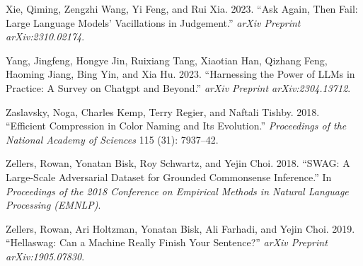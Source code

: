 \documentclass[
]{article}
\newlength{\cslhangindent}
\newenvironment{CSLReferences}[2] %
 {\begin{list}{}{%
  \setlength{\itemindent}{0pt}
  \setlength{\leftmargin}{0pt}
  \setlength{\parsep}{0pt}
  \ifodd #1
   \setlength{\leftmargin}{\cslhangindent}
   \setlength{\itemindent}{-1\cslhangindent}
  \fi
  \setlength{\itemsep}{#2\baselineskip}}}
 {\end{list}}
\begin{document}
\begin{CSLReferences}{1}{0}
Xie, Qiming, Zengzhi Wang, Yi Feng, and Rui Xia. 2023. {``Ask Again,
Then Fail: Large Language Models' Vacillations in Judgement.''}
\emph{arXiv Preprint arXiv:2310.02174}.

Yang, Jingfeng, Hongye Jin, Ruixiang Tang, Xiaotian Han, Qizhang Feng,
Haoming Jiang, Bing Yin, and Xia Hu. 2023. {``Harnessing the Power of
LLMs in Practice: A Survey on Chatgpt and Beyond.''} \emph{arXiv
Preprint arXiv:2304.13712}.

Zaslavsky, Noga, Charles Kemp, Terry Regier, and Naftali Tishby. 2018.
{``Efficient Compression in Color Naming and Its Evolution.''}
\emph{Proceedings of the National Academy of Sciences} 115 (31):
7937--42.

Zellers, Rowan, Yonatan Bisk, Roy Schwartz, and Yejin Choi. 2018.
{``SWAG: A Large-Scale Adversarial Dataset for Grounded Commonsense
Inference.''} In \emph{Proceedings of the 2018 Conference on Empirical
Methods in Natural Language Processing (EMNLP)}.

Zellers, Rowan, Ari Holtzman, Yonatan Bisk, Ali Farhadi, and Yejin Choi.
2019. {``Hellaswag: Can a Machine Really Finish Your Sentence?''}
\emph{arXiv Preprint arXiv:1905.07830}.

\end{CSLReferences}
\end{document}
